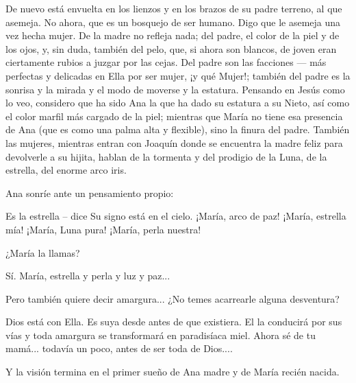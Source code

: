 \documentclass[12pt, twoside, openright]{book} %
\begin{document}
De nuevo está envuelta en los lienzos y en los brazos de su padre terreno, al que asemeja. No ahora, que es un bosquejo de ser humano. Digo que le asemeja una vez hecha mujer. De la madre no refleja nada; del padre, el color de la piel y de los ojos, y, sin duda, también del pelo, que, si ahora son blancos, de joven eran ciertamente rubios a juzgar por las cejas. Del padre son las facciones — más perfectas y delicadas en Ella por ser mujer, ¡y qué Mujer!; también del padre es la sonrisa y la mirada y el modo de moverse y la estatura. Pensando en Jesús como lo veo, considero que ha sido Ana la que ha dado su estatura a su Nieto, así como el color marfil más cargado de la piel; mientras que María no tiene esa presencia de Ana (que es como una palma alta y flexible), sino la finura del padre. También las mujeres, mientras entran con Joaquín donde se encuentra la madre feliz para devolverle a su hijita, hablan de la tormenta y del prodigio de la Luna, de la estrella, del enorme arco iris. 

Ana sonríe ante un pensamiento propio: 

Es la estrella – dice Su signo está en el cielo. ¡María, arco de paz! ¡María, estrella mía! ¡María, Luna pura! ¡María, perla nuestra! 

¿María la llamas? 

Sí. María, estrella y perla y luz y paz... 

Pero también quiere decir amargura... ¿No temes acarrearle alguna desventura? 

Dios está con Ella. Es suya desde antes de que existiera. El la conducirá por sus vías y toda amargura se transformará en paradisíaca miel. Ahora sé de tu mamá... todavía un poco, antes de ser toda de Dios.... 

Y la visión termina en el primer sueño de Ana madre y de María recién nacida. 
\end{document}
